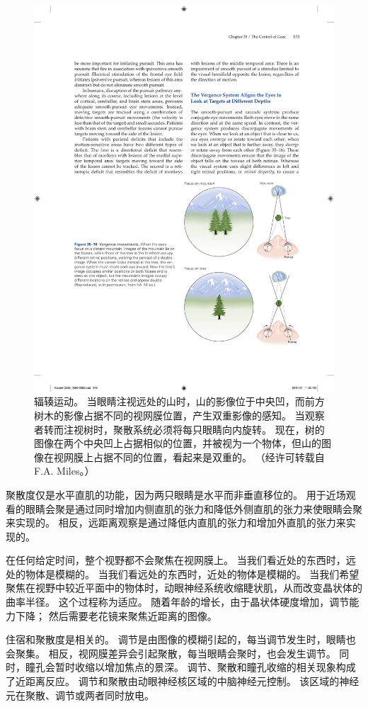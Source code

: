 \begin{figure}[htbp]
	\centering
	\includegraphics[width=0.65\linewidth]{chap35/fig_35_16}
	\caption{辐辏运动。 当眼睛注视远处的山时，山的影像位于中央凹，而前方树木的影像占据不同的视网膜位置，产生双重影像的感知。 当观察者转而注视树时，聚散系统必须将每只眼睛向内旋转。 现在，树的图像在两个中央凹上占据相似的位置，并被视为一个物体，但山的图像在视网膜上占据不同的位置，看起来是双重的。 （经许可转载自 F.A. Miles。）}
	\label{fig:35_16}
\end{figure}


聚散度仅是水平直肌的功能，因为两只眼睛是水平而非垂直移位的。
用于近场观看的眼睛会聚是通过同时增加内侧直肌的张力和降低外侧直肌的张力来使眼睛会聚来实现的。
相反，远距离观察是通过降低内直肌的张力和增加外直肌的张力来实现的。


在任何给定时间，整个视野都不会聚焦在视网膜上。
当我们看近处的东西时，远处的物体是模糊的。
当我们看远处的东西时，近处的物体是模糊的。
当我们希望聚焦在视野中较近平面中的物体时，动眼神经系统收缩睫状肌，从而改变晶状体的曲率半径。
这个过程称为适应。
随着年龄的增长，由于晶状体硬度增加，调节能力下降； 然后需要老花镜来聚焦近距离的图像。


住宿和聚散度是相关的。
调节是由图像的模糊引起的，每当调节发生时，眼睛也会聚集。
相反，视网膜差异会引起聚散，每当眼睛会聚时，也会发生调节。
同时，瞳孔会暂时收缩以增加焦点的景深。
调节、聚散和瞳孔收缩的相关现象构成了近距离反应。
调节和聚散由动眼神经核区域的中脑神经元控制。
该区域的神经元在聚散、调节或两者同时放电。



